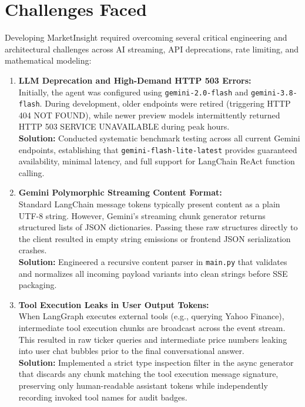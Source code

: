 \documentclass[12pt,a4paper]{report}
\begin{document}
\clearpage
\chapter{Challenges Faced}

Developing MarketInsight required overcoming several critical engineering and architectural challenges across AI streaming, API deprecations, rate limiting, and mathematical modeling:

\begin{enumerate}[leftmargin=*,label=\textbf{\arabic*.}]
  \item \textbf{LLM Deprecation and High-Demand HTTP 503 Errors:}\\
  Initially, the agent was configured using \texttt{gemini-2.0-flash} and \texttt{gemini-3.8-flash}. During development, older endpoints were retired (triggering HTTP 404 NOT FOUND), while newer preview models intermittently returned HTTP 503 SERVICE UNAVAILABLE during peak hours. \\
  \textbf{Solution:} Conducted systematic benchmark testing across all current Gemini endpoints, establishing that \texttt{gemini-flash-lite-latest} provides guaranteed availability, minimal latency, and full support for LangChain ReAct function calling.

  \vspace{0.4cm}

  \item \textbf{Gemini Polymorphic Streaming Content Format:}\\
  Standard LangChain message tokens typically present content as a plain UTF-8 string. However, Gemini's streaming chunk generator returns structured lists of JSON dictionaries. Passing these raw structures directly to the client resulted in empty string emissions or frontend JSON serialization crashes. \\
  \textbf{Solution:} Engineered a recursive content parser in \texttt{main.py} that validates and normalizes all incoming payload variants into clean strings before SSE packaging.

  \vspace{0.4cm}

  \item \textbf{Tool Execution Leaks in User Output Tokens:}\\
  When LangGraph executes external tools (e.g., querying Yahoo Finance), intermediate tool execution chunks are broadcast across the event stream. This resulted in raw ticker queries and intermediate price numbers leaking into user chat bubbles prior to the final conversational answer. \\
  \textbf{Solution:} Implemented a strict type inspection filter in the async generator that discards any chunk matching the tool execution message signature, preserving only human-readable assistant tokens while independently recording invoked tool names for audit badges.


\end{enumerate}
\end{document}
